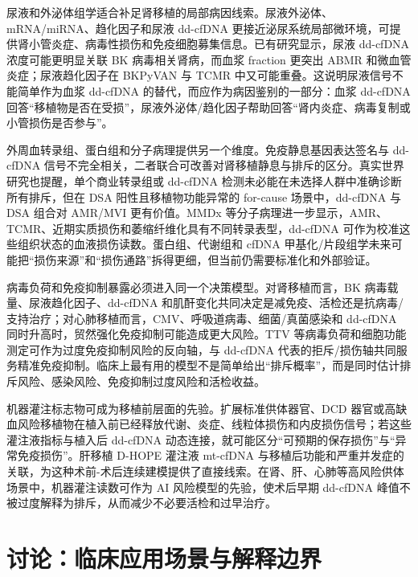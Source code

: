 \documentclass[11pt,a4paper]{article}
\begin{document}
尿液和外泌体组学适合补足肾移植的局部病因线索。尿液外泌体、mRNA/miRNA、趋化因子和尿液 dd-cfDNA
更接近泌尿系统局部微环境，可提供肾小管炎症、病毒性损伤和免疫细胞募集信息\cite{liquidbiopsyfor2023, molecularimmunemonitoring2023}。已有研究显示，尿液
dd-cfDNA 浓度可能更明显关联 BK
病毒相关肾病，而血浆 fraction 更突出 ABMR 和微血管炎症；尿液趋化因子在 BKPyVAN
与 TCMR 中又可能重叠\cite{usingbothplasma2022, levelsofdonor2022}。这说明尿液信号不能简单作为血浆
dd-cfDNA 的替代，而应作为病因鉴别的一部分：血浆 dd-cfDNA
回答``移植物是否在受损''，尿液外泌体/趋化因子帮助回答``肾内炎症、病毒复制或小管损伤是否参与''。

外周血转录组、蛋白组和分子病理提供另一个维度。免疫静息基因表达签名与 dd-cfDNA
信号不完全相关，二者联合可改善对肾移植静息与排斥的区分\cite{clinicalvalidationof2021}。真实世界研究也提醒，单个商业转录组或
dd-cfDNA 检测未必能在未选择人群中准确诊断所有排斥，但在 DSA
阳性且移植物功能异常的 for-cause 场景中，dd-cfDNA
与 DSA 组合对 AMR/MVI 更有价值\cite{bloodgeneexpression2024}。MMDx
等分子病理进一步显示，AMR、TCMR、近期实质损伤和萎缩纤维化具有不同转录表型，dd-cfDNA
可作为校准这些组织状态的血液损伤读数\cite{themolecularphenotype2023, distinctmolecularprocesses2023}。蛋白组、代谢组和 cfDNA
甲基化/片段组学未来可能把``损伤来源''和``损伤通路''拆得更细，但当前仍需要标准化和外部验证\cite{areviewof2024, donorderivedcell20251}。

病毒负荷和免疫抑制暴露必须进入同一个决策模型。对肾移植而言，BK
病毒载量、尿液趋化因子、dd-cfDNA 和肌酐变化共同决定是减免疫、活检还是抗病毒/支持治疗；对心肺移植而言，CMV、呼吸道病毒、细菌/真菌感染和
dd-cfDNA 同时升高时，贸然强化免疫抑制可能造成更大风险。TTV
等病毒负荷和细胞功能测定可作为过度免疫抑制风险的反向轴，与 dd-cfDNA
代表的拒斥/损伤轴共同服务精准免疫抑制\cite{predictingoverimmunosuppression2024}。临床上最有用的模型不是简单给出``排斥概率''，而是同时估计排斥风险、感染风险、免疫抑制过度风险和活检收益。

机器灌注标志物可成为移植前层面的先验。扩展标准供体器官、DCD
器官或高缺血风险移植物在植入前已经释放代谢、炎症、线粒体损伤和内皮损伤信号；若这些灌注液指标与植入后
dd-cfDNA
动态连接，就可能区分``可预期的保存损伤''与``异常免疫损伤''。肝移植 D-HOPE
灌注液 mt-cfDNA 与移植后功能和严重并发症的关联，为这种术前-术后连续建模提供了直接线索\cite{circulatingcellfree2024}。在肾、肝、心肺等高风险供体场景中，机器灌注读数可作为
AI 风险模型的先验，使术后早期 dd-cfDNA
峰值不被过度解释为排斥，从而减少不必要活检和过早治疗。

\section{讨论：临床应用场景与解释边界}\label{ux8ba8ux8bbaux4e34ux5e8aux5e94ux7528ux573aux666fux4e0eux89e3ux91caux8fb9ux754c}
\end{document}
